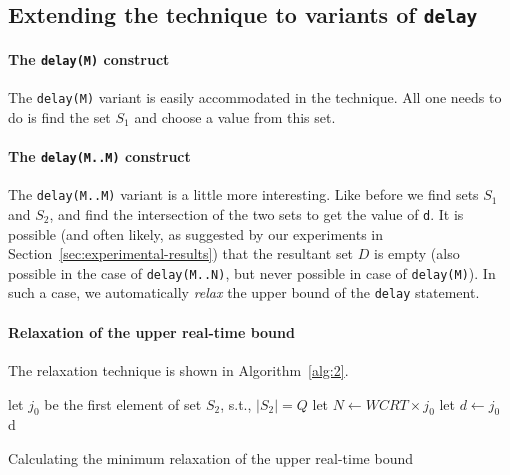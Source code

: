 \subsection{Extending the technique to variants of \texttt{delay}}
\label{sec:extend-tehcn-vari}

\paragraph{The \texttt{delay(M)} construct}
\label{sec:extend-techn-vari}

The \texttt{delay(M)} variant is easily accommodated in the
technique. All one needs to do is find the set $S_1$ and choose a value
from this set.

\paragraph{The \texttt{delay(M..M)} construct}
\label{sec:extend-techn-vari}

The \texttt{delay(M..M)} variant is a little more interesting. Like
before we find sets $S_1$ and $S_2$, and find the intersection of the
two sets to get the value of \texttt{d}. It is possible (and often
likely, as suggested by our experiments in
Section~\ref{sec:experimental-results}) that the resultant set $D$ is
empty (also possible in the case of \texttt{delay(M..N)}, but never
possible in case of \texttt{delay(M)}). In such a case, we automatically
\textit{relax} the upper bound of the \texttt{delay} statement.

\paragraph{Relaxation of the upper real-time bound}
\label{sec:over-appr-relax}

The relaxation technique is shown in Algorithm~\ref{alg:2}.
  
\begin{algorithm}[t!]
  \begin{minipage}{1.0\linewidth}
    \SetAlgoLined
     {
      let $j_{0}$ be the first element of set $S_2$, s.t., $|S_2|=Q$\;
      \ShowLn let $N \leftarrow WCRT \times j_0$\;
      let $d \leftarrow j_0$\;
    }
    \Return d\;
    \caption{Calculating the minimum relaxation of the upper real-time
      bound}
    \label{alg:2}
  \end{minipage}
\end{algorithm}


